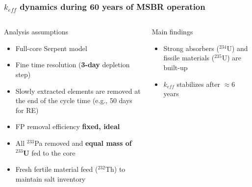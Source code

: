 \begin{frame}
\frametitle{$k_{eff}$ dynamics during 60 years of MSBR operation}
\vspace{-3mm}
\begin{columns}
	\column{4.3cm}
	\begin{block}{Analysis assumptions}
		\fontsize{7}{9}\selectfont
		\begin{itemize}
			\item Full-core Serpent model
			\item Fine time resolution (\textbf{3-day} depletion step)
			\item Slowly extracted elements are removed at the end of the 
			cycle time (e.g., 50 days for RE)
			\item FP removal efficiency \textbf{fixed, ideal}
			\item All $^{233}$Pa removed and \textbf{equal mass of $^{233}$U} 
			fed to the core
			\item Fresh fertile material feed ($^{232}$Th) to maintain salt 
			inventory
		\end{itemize}
	\end{block}
	\vspace{-2mm}
	\begin{block}{Main findings}
	\fontsize{7}{9}\selectfont
	\begin{itemize}
		\item Strong absorbers ($^{234}$U) and fissile materials ($^{235}$U) 
		are built-up
		\item $k_{eff}$ stabilizes after $\approx6$ years
	\end{itemize}  
	\end{block}  	
	

\end{columns}
\end{frame}
